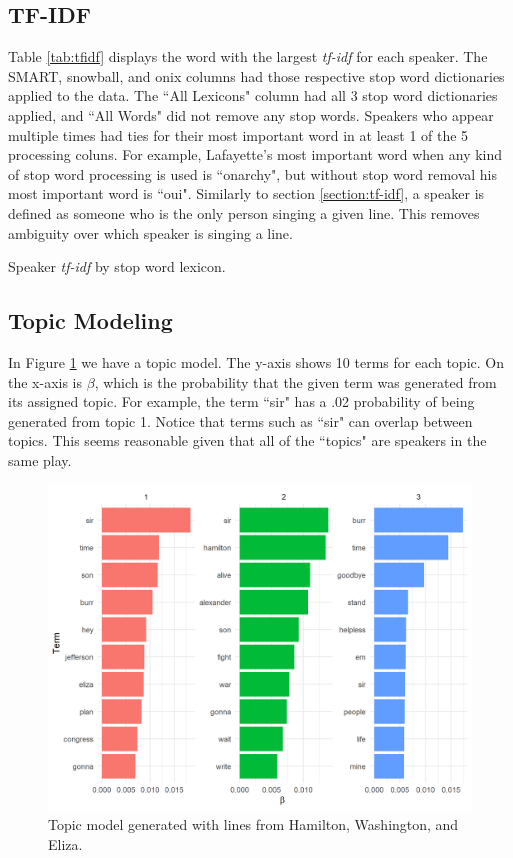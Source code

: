 \documentclass{article}
\begin{document}
\subsection{TF-IDF}

Table \ref{tab:tfidf} displays the word with the largest \emph{tf-idf} for each speaker. The SMART, snowball, and onix columns had those respective stop word dictionaries applied to the data. The ``All Lexicons" column had all 3 stop word dictionaries applied, and ``All Words" did not remove any stop words. Speakers who appear multiple times had ties for their most important word in at least 1 of the 5 processing coluns. For example, Lafayette's most important word when any kind of stop word processing is used is ``onarchy", but without stop word removal his most important word is ``oui". Similarly to section \ref{section:tf-idf}, a speaker is defined as someone who is the only person singing a given line. This removes ambiguity over which speaker is singing a line. 

\begin{table}
\caption{Speaker \emph{tf-idf} by stop word lexicon.}
\label{tab:tfidf}

\end{table}

\subsection{Topic Modeling}

In Figure \ref{fig:topic_model} we have a topic model. The y-axis shows 10 terms for each topic. On the x-axis is $\beta$, which is the probability that the given term was generated from its assigned topic. For example, the term ``sir" has a .02 probability of being generated from topic 1. Notice that terms such as ``sir" can overlap between topics. This seems reasonable given that all of the ``topics" are speakers in the same play.

\begin{figure}[h]
    \caption{Topic model generated with lines from Hamilton, Washington, and Eliza. \label{fig:topic_model}}
    \centering
    \includegraphics[width=0.7\paperwidth]{topic_model.png}
\end{figure}
\end{document}
